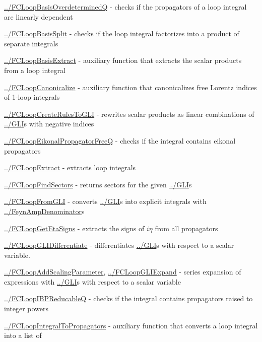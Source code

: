 \documentclass[../FeynCalcManual.tex]{subfiles}
\begin{document}
\begin{itemize}
{\item
  \hyperlink{../fcloopbasisoverdeterminedq}{../FCLoopBasisOverdeterminedQ}
  - checks if the propagators of a loop integral are linearly dependent
\item
  \hyperlink{../fcloopbasissplit}{../FCLoopBasisSplit} - checks if the
  loop integral factorizes into a product of separate integrals
\item
  \hyperlink{../fcloopbasisextract}{../FCLoopBasisExtract} - auxiliary
  function that extracts the scalar products from a loop integral
\item
  \hyperlink{../fcloopcanonicalize}{../FCLoopCanonicalize} - auxiliary
  function that canonicalizes free Lorentz indices of 1-loop integrals
\item
  \hyperlink{../fcloopcreaterulestogli}{../FCLoopCreateRulesToGLI} -
  rewrites scalar products as linear combinations of
  \hyperlink{../gli}{../GLI}s with negative indices
\item
  \hyperlink{../fcloopeikonalpropagatorfreeq}{../FCLoopEikonalPropagatorFreeQ}
  - checks if the integral contains eikonal propagators
\item
  \hyperlink{../fcloopextract}{../FCLoopExtract} - extracts loop
  integrals
\item
  \hyperlink{../fcloopfindsectors}{../FCLoopFindSectors} - returns
  sectors for the given \hyperlink{../gli}{../GLI}s
\item
  \hyperlink{../fcloopfromgli}{../FCLoopFromGLI} - converts
  \hyperlink{../gli}{../GLI}s into explicit integrals with
  \hyperlink{../feynampdenominator}{../FeynAmpDenominator}s
\item
  \hyperlink{../fcloopgetetasigns}{../FCLoopGetEtaSigns} - extracts the
  signs of \(i \eta\) from all propagators
\item
  \hyperlink{../fcloopglidifferentiate}{../FCLoopGLIDifferentiate} -
  differentiates \hyperlink{../gli}{../GLI}s with respect to a scalar
  variable.
\item
  \hyperlink{../fcloopaddscalingparameter}{../FCLoopAddScalingParameter},
  \hyperlink{../fcloopgliexpand}{../FCLoopGLIExpand} - series expansion
  of expressions with \hyperlink{../gli}{../GLI}s with respect to a
  scalar variable
\item
  \hyperlink{../fcloopibpreducableq}{../FCLoopIBPReducableQ} - checks if
  the integral contains propagators raised to integer powers
\item
  \hyperlink{../fcloopintegraltopropagators}{../FCLoopIntegralToPropagators}
  - auxiliary function that converts a loop integral into a list of
}
\end{itemize}
\end{document}
